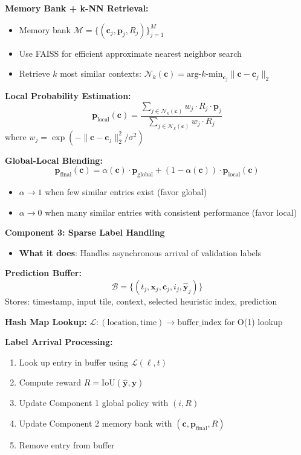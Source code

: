 \documentclass[11pt]{article}
\begin{document}
\textbf{Memory Bank + k-NN Retrieval:}
\begin{itemize}
    \item Memory bank $\mathcal{M} = \{(\mathbf{c}_j, \mathbf{p}_j, R_j)\}_{j=1}^{M}$
    \item Use FAISS for efficient approximate nearest neighbor search
    \item Retrieve $k$ most similar contexts: $\mathcal{N}_k(\mathbf{c}) = \text{arg-}k\text{-min}_{\mathbf{c}_j} \|\mathbf{c} - \mathbf{c}_j\|_2$
\end{itemize}

\textbf{Local Probability Estimation:}
\[
\mathbf{p}_{\text{local}}(\mathbf{c}) = \frac{\sum_{j \in \mathcal{N}_k(\mathbf{c})} w_j \cdot R_j \cdot \mathbf{p}_j}{\sum_{j \in \mathcal{N}_k(\mathbf{c})} w_j \cdot R_j}
\]
where $w_j = \exp(-\|\mathbf{c} - \mathbf{c}_j\|_2^2 / \sigma^2)$

\textbf{Global-Local Blending:}
\[
\mathbf{p}_{\text{final}}(\mathbf{c}) = \alpha(\mathbf{c}) \cdot \mathbf{p}_{\text{global}} + (1 - \alpha(\mathbf{c})) \cdot \mathbf{p}_{\text{local}}(\mathbf{c})
\]
\begin{itemize}
    \item $\alpha \to 1$ when few similar entries exist (favor global)
    \item $\alpha \to 0$ when many similar entries with consistent performance (favor local)
\end{itemize}

\textbf{Component 3: Sparse Label Handling}

\begin{itemize}
    \item \textbf{What it does}: Handles asynchronous arrival of validation labels
\end{itemize}

\textbf{Prediction Buffer:}
\[
\mathcal{B} = \{(t_j, \mathbf{x}_j, \mathbf{c}_j, i_j, \hat{\mathbf{y}}_j)\}
\]
Stores: timestamp, input tile, context, selected heuristic index, prediction

\textbf{Hash Map Lookup:}
$\mathcal{L}: (\text{location}, \text{time}) \to \text{buffer\_index}$ for O(1) lookup

\textbf{Label Arrival Processing:}
\begin{enumerate}
    \item Look up entry in buffer using $\mathcal{L}(\ell, t)$
    \item Compute reward $R = \text{IoU}(\hat{\mathbf{y}}, \mathbf{y})$
    \item Update Component 1 global policy with $(i, R)$
    \item Update Component 2 memory bank with $(\mathbf{c}, \mathbf{p}_{\text{final}}, R)$
    \item Remove entry from buffer
\end{enumerate}
\end{document}
